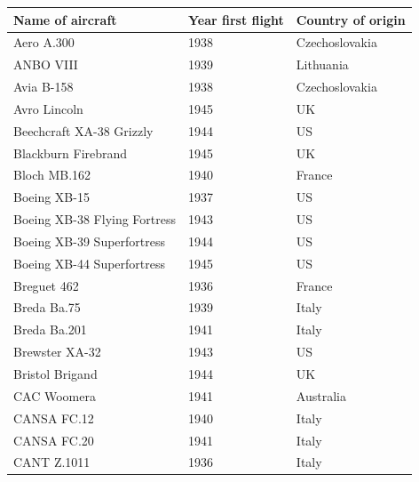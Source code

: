 \documentclass{article}
\begin{document}
\begin{tabular}{lll}
\toprule
Name of aircraft & Year first flight & Country of origin \\
\midrule
Aero A.300 & 1938 & Czechoslovakia \\
ANBO VIII & 1939 & Lithuania \\
Avia B-158 & 1938 & Czechoslovakia \\
Avro Lincoln & 1945 & UK \\
Beechcraft XA-38 Grizzly & 1944 & US \\
Blackburn Firebrand & 1945 & UK \\
Bloch MB.162 & 1940 & France \\
Boeing XB-15 & 1937 & US \\
Boeing XB-38 Flying Fortress & 1943 & US \\
Boeing XB-39 Superfortress & 1944 & US \\
Boeing XB-44 Superfortress & 1945 & US \\
Breguet 462 & 1936 & France \\
Breda Ba.75 & 1939 & Italy \\
Breda Ba.201 & 1941 & Italy \\
Brewster XA-32 & 1943 & US \\
Bristol Brigand & 1944 & UK \\
CAC Woomera & 1941 & Australia \\
CANSA FC.12 & 1940 & Italy \\
CANSA FC.20 & 1941 & Italy \\
CANT Z.1011 & 1936 & Italy \\
\bottomrule
\end{tabular}
\end{document}
